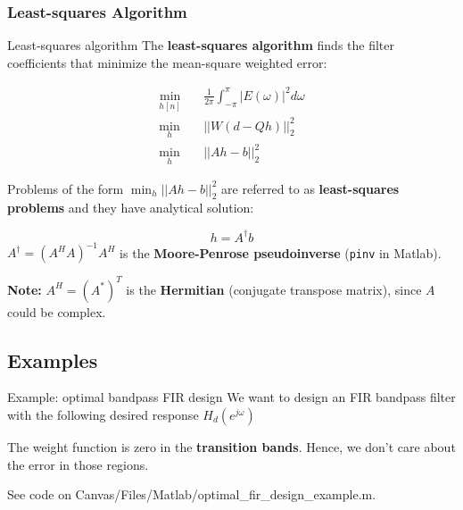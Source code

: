\documentclass[10pt, handout]{beamer}
\begin{document}
\subsubsection{Least-squares Algorithm}
\begin{frame}{Least-squares algorithm}
The \textbf{least-squares algorithm} finds the filter coefficients that minimize the mean-square weighted error:

\begin{align*}
\min_{h[n]} \quad&\frac{1}{2\pi}\int_{-\pi}^{\pi} |E(\omega)|^2d\omega \tag{mean square weighted error}\\
\min_{h}\quad &||W(d - Qh)||_2^2 \tag{in matrix notation} \\
\min_{h} \quad&||Ah - b||_2^2 \tag{change of variables $A = WQ$ and $b = Wd$}
\end{align*}

Problems of the form $\min_h ||Ah - b||_2^2$ are referred to as \textbf{least-squares problems} and they have analytical solution:

\begin{equation*}
	h = A^\dagger b \tag{least-squares solution}
\end{equation*}
$A^\dagger = (A^HA)^{-1}A^H$ is the \textbf{Moore-Penrose pseudoinverse} (\texttt{pinv} in Matlab). 

\textbf{Note:} $A^H = (A^*)^T$ is the \textbf{Hermitian} (conjugate transpose matrix), since $A$ could be complex.
\end{frame}

%
\subsection{Examples}
\begin{frame}{Example: optimal bandpass FIR design}
	We want to design an FIR bandpass filter with the following desired response $H_d(e^{j\omega})$

	The weight function is zero in the {\color{red!50} \textbf{transition bands}}. Hence, we don't care about the error in those regions.
	
	\begin{center}
		\resizebox{0.7\textwidth}{!}{}
	\end{center}
	
	See code on Canvas/Files/Matlab/optimal\_fir\_design\_example.m.
\end{frame}
\end{document}
